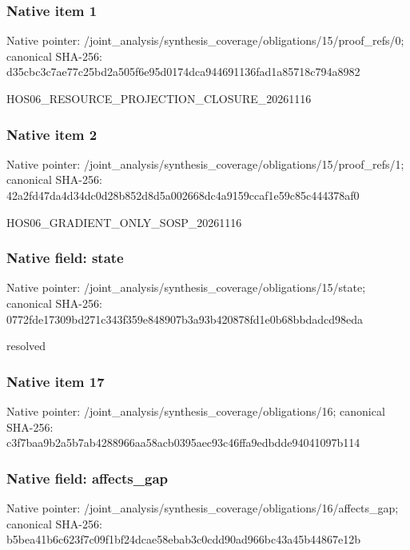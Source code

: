 \documentclass[10pt,a4paper]{article}
\begin{document}
\subsubsection{Native item 1}
Native pointer: /joint\_\allowbreak{}analysis/synthesis\_\allowbreak{}coverage/obligations/15/proof\_\allowbreak{}refs/0; canonical SHA-256: d35cbc3c7ae77c25bd2a505f6e95d0174dca944691136fad1a85718c794a8982

\begingroup\raggedright\sloppy HOS06\_\allowbreak{}RESOURCE\_\allowbreak{}PROJECTION\_\allowbreak{}CLOSURE\_\allowbreak{}20261116\par\endgroup

\subsubsection{Native item 2}
Native pointer: /joint\_\allowbreak{}analysis/synthesis\_\allowbreak{}coverage/obligations/15/proof\_\allowbreak{}refs/1; canonical SHA-256: 42a2fd47da4d34dc0d28b852d8d5a002668dc4a9159ccaf1e59c85c444378af0

\begingroup\raggedright\sloppy HOS06\_\allowbreak{}GRADIENT\_\allowbreak{}ONLY\_\allowbreak{}SOSP\_\allowbreak{}20261116\par\endgroup

\subsubsection{Native field: state}
Native pointer: /joint\_\allowbreak{}analysis/synthesis\_\allowbreak{}coverage/obligations/15/state; canonical SHA-256: 0772fde17309bd271c343f359e848907b3a93b420878fd1e0b68bbdadcd98eda

\begingroup\raggedright\sloppy resolved\par\endgroup

\subsubsection{Native item 17}
Native pointer: /joint\_\allowbreak{}analysis/synthesis\_\allowbreak{}coverage/obligations/16; canonical SHA-256: c3f7baa9b2a5b7ab4288966aa58acb0395aec93c46ffa9edbdde94041097b114

\subsubsection{Native field: affects\_\allowbreak{}gap}
Native pointer: /joint\_\allowbreak{}analysis/synthesis\_\allowbreak{}coverage/obligations/16/affects\_\allowbreak{}gap; canonical SHA-256: b5bea41b6c623f7c09f1bf24dcae58ebab3c0cdd90ad966bc43a45b44867e12b
\end{document}
